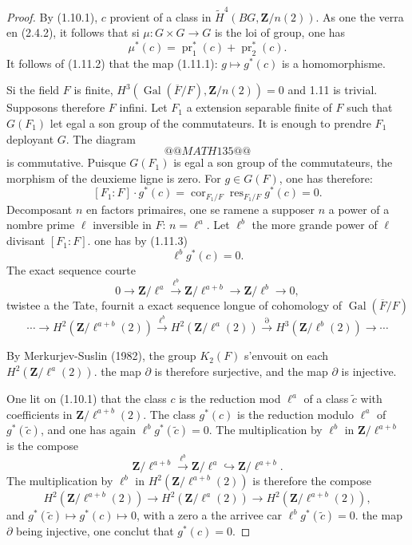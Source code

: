 \documentclass[11pt,a4paper]{article}
\theoremstyle{plain}
\theoremstyle{definition}
\DeclareMathOperator{\Gal}{Gal}
\DeclareMathOperator{\pr}{pr}
\DeclareMathOperator{\cores}{cor}
\DeclareMathOperator{\res}{res}
\begin{document}
\begin{proof}
By (1.10.1), $c$ provient of a class in $\widetilde{H}^4(BG, \mathbf{Z}/n(2))$. As one the verra en (2.4.2), it follows that si $\mu : G \times G \to G$ is the loi of group, one has
\begin{equation}\label{1.11.2}
\mu^*(c) = \pr_1^*(c) + \pr_2^*(c).
\end{equation}
It follows of (1.11.2) that the map (1.11.1): $g \mapsto g^*(c)$ is a homomorphisme.

Si the field $F$ is finite, $H^3(\Gal(\overline{F}/F), \mathbf{Z}/n(2)) = 0$ and 1.11 is trivial. Supposons therefore $F$ infini. Let $F_1$ a extension separable finite of $F$ such that $G(F_1)$ let egal a son group of the commutateurs. It is enough to prendre $F_1$ deployant $G$. The diagram
\[
@@MATH135@@
\]
is commutative. Puisque $G(F_1)$ is egal a son group of the commutateurs, the morphism of the deuxieme ligne is zero. For $g \in G(F)$, one has therefore:
\begin{equation}\label{1.11.3}
[F_1 : F] \cdot g^*(c) = \cores_{F_1/F} \res_{F_1/F} g^*(c) = 0.
\end{equation}
Decomposant $n$ en factors primaires, one se ramene a supposer $n$ a power of a nombre prime $\ell$ inversible in $F$: $n = \ell^a$. Let $\ell^b$ the more grande power of $\ell$ divisant $[F_1:F]$. one has by (1.11.3)
\[
\ell^b g^*(c) = 0.
\]
The exact sequence courte
\[
0 \to \mathbf{Z}/\ell^a \xrightarrow{\ell^b} \mathbf{Z}/\ell^{a+b} \to \mathbf{Z}/\ell^b \to 0,
\]
twistee a the Tate, fournit a exact sequence longue of cohomology of $\Gal(\overline{F}/F)$
\[
\cdots \to H^2(\mathbf{Z}/\ell^{a+b}(2)) \xrightarrow{\ell^b} H^2(\mathbf{Z}/\ell^a(2)) \xrightarrow{\partial} H^3(\mathbf{Z}/\ell^b(2)) \to \cdots
\]

By Merkurjev-Suslin (1982), the group $K_2(F)$ s'envouit on each $H^2(\mathbf{Z}/\ell^a(2))$. the map $\partial$ is therefore surjective, and the map $\partial$ is injective.

One lit on (1.10.1) that the class $c$ is the reduction mod $\ell^a$ of a class $\tilde{c}$ with coefficients in $\mathbf{Z}/\ell^{a+b}(2)$. The class $g^*(c)$ is the reduction modulo $\ell^a$ of $g^*(\tilde{c})$, and one has again $\ell^b g^*(\tilde{c}) = 0$. The multiplication by $\ell^b$ in $\mathbf{Z}/\ell^{a+b}$ is the compose
\[
\mathbf{Z}/\ell^{a+b} \xrightarrow{\ell^b} \mathbf{Z}/\ell^a \hookrightarrow \mathbf{Z}/\ell^{a+b}.
\]
The multiplication by $\ell^b$ in $H^2(\mathbf{Z}/\ell^{a+b}(2))$ is therefore the compose
\[
H^2(\mathbf{Z}/\ell^{a+b}(2)) \to H^2(\mathbf{Z}/\ell^a(2)) \to H^2(\mathbf{Z}/\ell^{a+b}(2)),
\]
and $g^*(\tilde{c}) \mapsto g^*(c) \mapsto 0$,
with a zero a the arrivee car $\ell^b g^*(\tilde{c}) = 0$. the map $\partial$ being injective, one conclut that $g^*(c) = 0$.
\end{proof}
\end{document}
